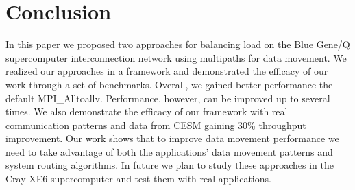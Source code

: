 \section{Conclusion}
\label{sec:conclusion}

In this paper we proposed two approaches for balancing load on the Blue Gene/Q supercomputer interconnection network using multipaths for data movement. We realized our approaches in a framework and demonstrated the efficacy of our work through a set of benchmarks. Overall, we gained better performance the default MPI\_Alltoallv. Performance, however, can be improved up to several times. We also demonstrate the efficacy of our framework with real communication patterns and data from CESM gaining 30\% throughput improvement. Our work shows that to improve data movement performance we need to take advantage of both the applications' data movement patterns and system routing algorithms. In future we plan to study these approaches in the Cray XE6 supercomputer and test them with real applications.
